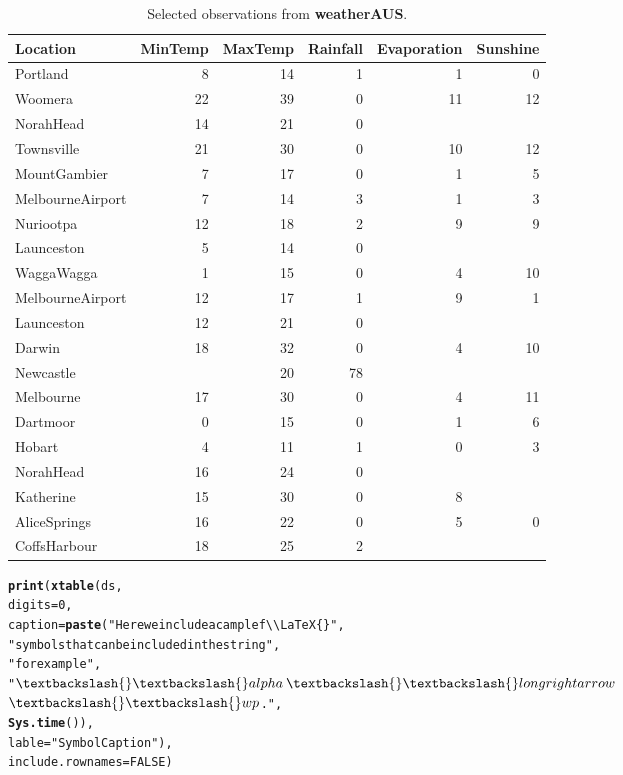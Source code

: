 \documentclass[a4paper]{article}\usepackage[]{graphicx}\usepackage[]{color}
\makeatletter
\newcommand{\hlnum}[1]{\textcolor[rgb]{0.686,0.059,0.569}{#1}}%
\newcommand{\hlstr}[1]{\textcolor[rgb]{0.192,0.494,0.8}{#1}}%
\newcommand{\hlstd}[1]{\textcolor[rgb]{0.345,0.345,0.345}{#1}}%
\newcommand{\hlkwc}[1]{\textcolor[rgb]{0.333,0.667,0.333}{#1}}%
\newcommand{\hlkwd}[1]{\textcolor[rgb]{0.737,0.353,0.396}{\textbf{#1}}}%
\newenvironment{kframe}{%
 \def\at@end@of@kframe{}%
 \ifinner\ifhmode%
  \def\at@end@of@kframe{\end{minipage}}%
  \begin{minipage}{\columnwidth}%
 \fi\fi%
 \def\FrameCommand##1{\hskip\@totalleftmargin \hskip-\fboxsep
 \colorbox{shadecolor}{##1}\hskip-\fboxsep
     \hskip-\linewidth \hskip-\@totalleftmargin \hskip\columnwidth}%
 \MakeFramed {\advance\hsize-\width
   \@totalleftmargin\z@ \linewidth\hsize
   \@setminipage}}%
 {\par\unskip\endMakeFramed%
 \at@end@of@kframe}
\makeatother
\begin{document}
\begin{table}[ht]
\centering
\begin{tabular}{lrrrrr}
  \hline
Location & MinTemp & MaxTemp & Rainfall & Evaporation & Sunshine \\ 
  \hline
Portland & 8 & 14 & 1 & 1 & 0 \\ 
  Woomera & 22 & 39 & 0 & 11 & 12 \\ 
  NorahHead & 14 & 21 & 0 &  &  \\ 
  Townsville & 21 & 30 & 0 & 10 & 12 \\ 
  MountGambier & 7 & 17 & 0 & 1 & 5 \\ 
  MelbourneAirport & 7 & 14 & 3 & 1 & 3 \\ 
  Nuriootpa & 12 & 18 & 2 & 9 & 9 \\ 
  Launceston & 5 & 14 & 0 &  &  \\ 
  WaggaWagga & 1 & 15 & 0 & 4 & 10 \\ 
  MelbourneAirport & 12 & 17 & 1 & 9 & 1 \\ 
  Launceston & 12 & 21 & 0 &  &  \\ 
  Darwin & 18 & 32 & 0 & 4 & 10 \\ 
  Newcastle &  & 20 & 78 &  &  \\ 
  Melbourne & 17 & 30 & 0 & 4 & 11 \\ 
  Dartmoor & 0 & 15 & 0 & 1 & 6 \\ 
  Hobart & 4 & 11 & 1 & 0 & 3 \\ 
  NorahHead & 16 & 24 & 0 &  &  \\ 
  Katherine & 15 & 30 & 0 & 8 &  \\ 
  AliceSprings & 16 & 22 & 0 & 5 & 0 \\ 
  CoffsHarbour & 18 & 25 & 2 &  &  \\ 
   \hline
\end{tabular}
\caption{Selected observations from \textbf{weatherAUS}.} 
\label{MyTable}
\end{table}
\begin{kframe}\begin{alltt}
\hlkwd{print}\hlstd{(}\hlkwd{xtable}\hlstd{(ds,}
             \hlkwc{digits}\hlstd{=}\hlnum{0}\hlstd{,}
             \hlkwc{caption}\hlstd{=}\hlkwd{paste}\hlstd{(}\hlstr{"Here we include a cample f \textbackslash{}\textbackslash{}LaTeX\{\}"}\hlstd{,}
                           \hlstr{"symbols that can be included in the string"}\hlstd{,}
                           \hlstr{"for example"}\hlstd{,}
                           \hlstr{"$\textbackslash{}\textbackslash{}alpha$ $\textbackslash{}\textbackslash{}longrightarrow$ $\textbackslash{}\textbackslash{}wp$."}\hlstd{,}
                           \hlkwd{Sys.time}\hlstd{()),}
             \hlkwc{lable}\hlstd{=}\hlstr{"SymbolCaption"}\hlstd{),}
      \hlkwc{include.rownames}\hlstd{=}\hlnum{FALSE}\hlstd{)}
\end{alltt}
\end{kframe}%
\end{document}
